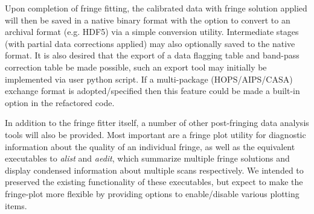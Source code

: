 Upon completion of fringe fitting, the calibrated data with fringe solution applied will then be saved in a native binary format with the option to convert to an archival format (e.g. HDF5) via a simple conversion utility. Intermediate stages (with partial data corrections applied) may also optionally saved to the native format. It is also desired that
the export of a data flagging table and band-pass correction table be made possible, such an export tool may initially be implemented via user python script. If a multi-package (HOPS/AIPS/CASA) exchange format is adopted/specified then this feature could be made a built-in option in the refactored code.

In addition to the fringe fitter itself, a number of other post-fringing data analysis tools will also be provided. Most important are
a fringe plot utility for diagnostic information about the quality of an individual fringe, as well as the equivalent executables to \textit{alist} and \textit{aedit}, which summarize multiple fringe solutions and display condensed information about multiple scans respectively.
We intended to preserved the existing functionality of these executables, but expect to make the fringe-plot more flexible by providing options
to enable/disable various plotting items.


